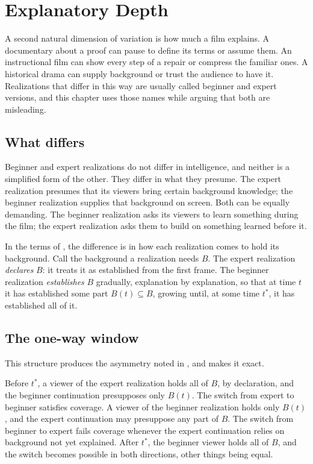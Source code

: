 \chapter{Explanatory Depth}\label{ch:depth}

A second natural dimension of variation is how much a film explains. A documentary about a proof can pause to define its terms or assume them. An instructional film can show every step of a repair or compress the familiar ones. A historical drama can supply background or trust the audience to have it. Realizations that differ in this way are usually called beginner and expert versions, and this chapter uses those names while arguing that both are misleading.

\section{What differs}

Beginner and expert realizations do not differ in intelligence, and neither is a simplified form of the other. They differ in what they presume. The expert realization presumes that its viewers bring certain background knowledge; the beginner realization supplies that background on screen. Both can be equally demanding. The beginner realization asks its viewers to learn something during the film; the expert realization asks them to build on something learned before it.

In the terms of , the difference is in how each realization comes to hold its background. Call the background a realization needs $B$. The expert realization \emph{declares} $B$: it treats it as established from the first frame. The beginner realization \emph{establishes} $B$ gradually, explanation by explanation, so that at time $t$ it has established some part $B(t)\subseteq B$, growing until, at some time $t^{*}$, it has established all of it.

\section{The one-way window}

This structure produces the asymmetry noted in , and makes it exact.

Before $t^{*}$, a viewer of the expert realization holds all of $B$, by declaration, and the beginner continuation presupposes only $B(t)$. The switch from expert to beginner satisfies coverage. A viewer of the beginner realization holds only $B(t)$, and the expert continuation may presuppose any part of $B$. The switch from beginner to expert fails coverage whenever the expert continuation relies on background not yet explained. After $t^{*}$, the beginner viewer holds all of $B$, and the switch becomes possible in both directions, other things being equal.

